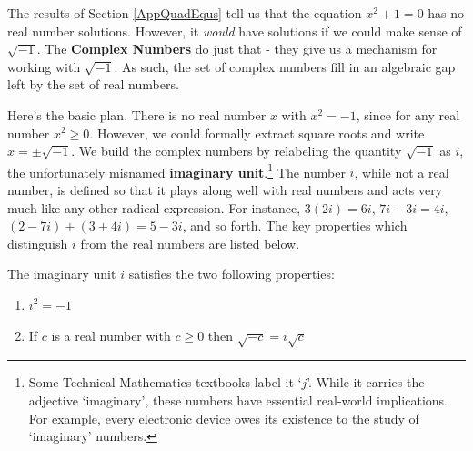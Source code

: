 \documentclass{ximera}
\begin{document}
	\author{Stitz-Zeager}




\setcounter{footnote}{0}

\label{AppCmpNums}

The results of Section \ref{AppQuadEqus} tell us that the equation $x^{2} + 1 = 0$ has no real number solutions. However, it \emph{would} have solutions if we could make sense of $\sqrt{-1}$. The \textbf{Complex Numbers} do just that - they give us a mechanism for working with $\sqrt{-1}$.  As such, the set of complex numbers fill in an algebraic gap left by the set of real numbers.  

\smallskip

Here's the basic plan.  There is no real number $x$ with $x^2 = -1$, since for any real number $x^2 \geq 0$.  However, we could formally extract square roots and write $x = \pm \sqrt{-1}$.  We build the complex numbers by relabeling the quantity $\sqrt{-1}$ as $i$, the unfortunately misnamed \textbf{imaginary unit}.\footnote{Some Technical Mathematics textbooks label it `$j$'.  While it carries the adjective `imaginary', these numbers have essential real-world implications.  For example, every electronic device owes its existence to the study of `imaginary' numbers.}  The number $i$, while not a real number, is defined so that it plays along well with real numbers and acts very much like any other radical expression.  For instance, $3(2i) = 6i$, $7i-3i = 4i$, $(2-7i) + (3 + 4i) = 5-3i$, and so forth.  The key properties which distinguish $i$ from the real numbers are listed below.

 

\begin{definition} \label{idefn} The imaginary unit $i$ satisfies the two following properties:

\begin{enumerate}

\item  $i^2 = -1$

\item  If $c$ is a real number with $c \geq 0$ then $\sqrt{-c} = i \sqrt{c}$

\end{enumerate}

\end{definition}
\end{document}
